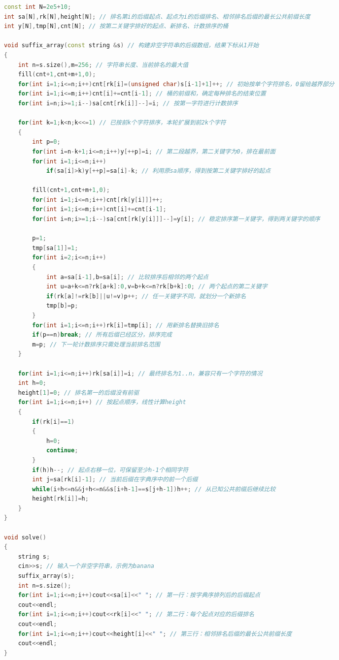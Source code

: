 \documentclass[10pt,landscape,a4paper]{article}
\begin{document}
\begin{multicols*}{3}
\begin{lstlisting}[language=C++]
const int N=2e5+10;
int sa[N],rk[N],height[N]; // 排名第i的后缀起点、起点为i的后缀排名、相邻排名后缀的最长公共前缀长度
int y[N],tmp[N],cnt[N]; // 按第二关键字排好的起点、新排名、计数排序的桶

void suffix_array(const string &s) // 构建非空字符串的后缀数组，结果下标从1开始
{
    int n=s.size(),m=256; // 字符串长度、当前排名的最大值
    fill(cnt+1,cnt+m+1,0);
    for(int i=1;i<=n;i++)cnt[rk[i]=(unsigned char)s[i-1]+1]++; // 初始按单个字符排名，0留给越界部分
    for(int i=1;i<=m;i++)cnt[i]+=cnt[i-1]; // 桶的前缀和，确定每种排名的结束位置
    for(int i=n;i>=1;i--)sa[cnt[rk[i]]--]=i; // 按第一字符进行计数排序

    for(int k=1;k<n;k<<=1) // 已按前k个字符排序，本轮扩展到前2k个字符
    {
        int p=0;
        for(int i=n-k+1;i<=n;i++)y[++p]=i; // 第二段越界，第二关键字为0，排在最前面
        for(int i=1;i<=n;i++)
            if(sa[i]>k)y[++p]=sa[i]-k; // 利用原sa顺序，得到按第二关键字排好的起点

        fill(cnt+1,cnt+m+1,0);
        for(int i=1;i<=n;i++)cnt[rk[y[i]]]++;
        for(int i=1;i<=m;i++)cnt[i]+=cnt[i-1];
        for(int i=n;i>=1;i--)sa[cnt[rk[y[i]]]--]=y[i]; // 稳定排序第一关键字，得到两关键字的顺序

        p=1;
        tmp[sa[1]]=1;
        for(int i=2;i<=n;i++)
        {
            int a=sa[i-1],b=sa[i]; // 比较排序后相邻的两个起点
            int u=a+k<=n?rk[a+k]:0,v=b+k<=n?rk[b+k]:0; // 两个起点的第二关键字
            if(rk[a]!=rk[b]||u!=v)p++; // 任一关键字不同，就划分一个新排名
            tmp[b]=p;
        }
        for(int i=1;i<=n;i++)rk[i]=tmp[i]; // 用新排名替换旧排名
        if(p==n)break; // 所有后缀已经区分，排序完成
        m=p; // 下一轮计数排序只需处理当前排名范围
    }

    for(int i=1;i<=n;i++)rk[sa[i]]=i; // 最终排名为1..n，兼容只有一个字符的情况
    int h=0;
    height[1]=0; // 排名第一的后缀没有前驱
    for(int i=1;i<=n;i++) // 按起点顺序，线性计算height
    {
        if(rk[i]==1)
        {
            h=0;
            continue;
        }
        if(h)h--; // 起点右移一位，可保留至少h-1个相同字符
        int j=sa[rk[i]-1]; // 当前后缀在字典序中的前一个后缀
        while(i+h<=n&&j+h<=n&&s[i+h-1]==s[j+h-1])h++; // 从已知公共前缀后继续比较
        height[rk[i]]=h;
    }
}

void solve()
{
    string s;
    cin>>s; // 输入一个非空字符串，示例为banana
    suffix_array(s);
    int n=s.size();
    for(int i=1;i<=n;i++)cout<<sa[i]<<" "; // 第一行：按字典序排列后的后缀起点
    cout<<endl;
    for(int i=1;i<=n;i++)cout<<rk[i]<<" "; // 第二行：每个起点对应的后缀排名
    cout<<endl;
    for(int i=1;i<=n;i++)cout<<height[i]<<" "; // 第三行：相邻排名后缀的最长公共前缀长度
    cout<<endl;
}


\end{lstlisting}
\end{multicols*}
\end{document}
